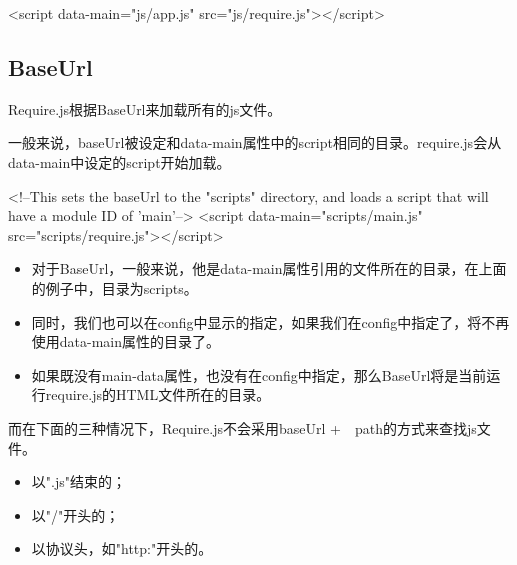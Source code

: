 \begin{HTML5}
<script data-main="js/app.js" src="js/require.js"></script>
\end{HTML5}



\subsection{BaseUrl}
Require.js根据BaseUrl来加载所有的js文件。

一般来说，baseUrl被设定和data-main属性中的script相同的目录。require.js会从data-main中设定的script开始加载。
\begin{HTML5}
<!--This sets the baseUrl to the "scripts" directory, and
    loads a script that will have a module ID of 'main'-->
<script data-main="scripts/main.js" src="scripts/require.js"></script>
\end{HTML5}

\begin{itemize}
\item 对于BaseUrl，一般来说，他是data-main属性引用的文件所在的目录，在上面的例子中，目录为scripts。
\item 同时，我们也可以在config中显示的指定，如果我们在config中指定了，将不再使用data-main属性的目录了。
\item 如果既没有main-data属性，也没有在config中指定，那么BaseUrl将是当前运行require.js的HTML文件所在的目录。
\end{itemize}


而在下面的三种情况下，Require.js不会采用baseUrl +　path的方式来查找js文件。
\begin{itemize}
\item 以".js"结束的；
\item 以"/"开头的；
\item 以协议头，如"http:"开头的。
\end{itemize}


